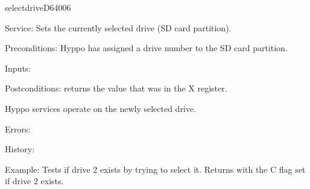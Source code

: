 \newpage
\begin{hyppotrap}{selectdrive}{D640}{06}
\item [Service:]
  Sets the currently selected drive (SD card partition).
\item [Preconditions:]
  Hyppo has assigned a drive number to the SD card partition.
\item [Inputs:]
\item [Postconditions:]
   returns the value that was in the X register.

  Hyppo services operate on the newly selected drive.
\item [Errors:]
\item [History:]
\item [Example:]
  Tests if drive 2 exists by trying to select it. Returns with the C flag set if
  drive 2 exists.
\end{hyppotrap}


